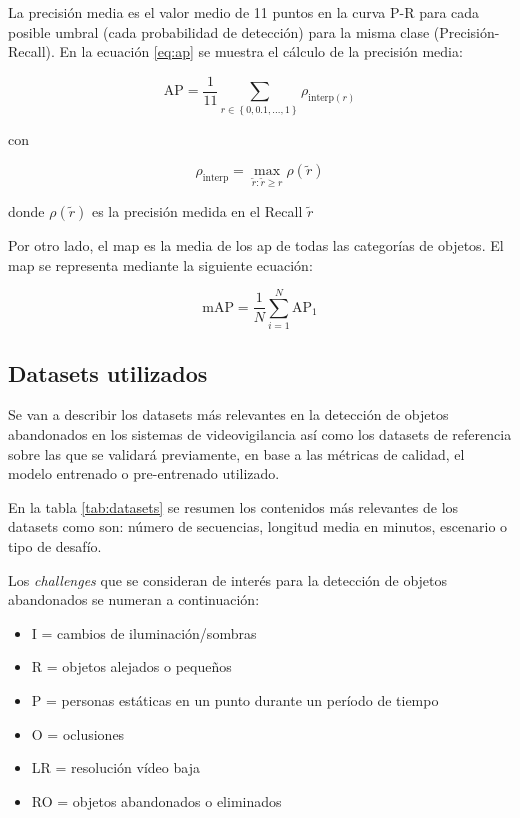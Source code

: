 La precisión media es el valor medio de 11 puntos en la curva P-R para cada posible umbral (cada probabilidad de detección) para la misma clase (Precisión-Recall). En la ecuación \ref{eq:ap} se muestra el cálculo de la precisión media:

\begin{equation}
\label{eq:ap}
\text{AP}=\frac{1}{11} \sum_{r\in \left \{ 0, 0.1, ...,1 \right \}}\rho_{\text{interp}\left ( r \right )}
\end{equation}

con

$$\rho_{\text{interp}} = \max_{\tilde{r}:\tilde{r} \geq r} \rho\left ( \tilde{r} \right )$$

donde $\rho\left ( \tilde{r} \right )$ es la precisión medida en el Recall $\tilde{r}$

Por otro lado, el \gls{map} es la media de los \gls{ap} de todas las categorías de objetos. El \gls{map} se representa mediante la siguiente ecuación:

\begin{equation}
\label{eq:map}
\text{mAP} = \frac{1}{N} \sum_{i=1}^{N} \text{AP}_{1}
\end{equation}

\subsection{Datasets utilizados}
\label{subsec:datasets-utilizados}

Se van a describir los datasets más relevantes en la detección de objetos abandonados en los sistemas de videovigilancia así como los datasets de referencia sobre las que se validará previamente, en base a las métricas de calidad, el modelo entrenado o pre-entrenado utilizado.

En la tabla \ref{tab:datasets} se resumen los contenidos más relevantes de los datasets como son: número de secuencias, longitud media en minutos, escenario o tipo de desafío.

Los \textit{challenges} que se consideran de interés para la detección de objetos abandonados se numeran a continuación:

\begin{itemize}
    \item I = cambios de iluminación/sombras
    \item R = objetos alejados o pequeños
    \item P = personas estáticas en un punto durante un período de tiempo
    \item O = oclusiones
    \item LR = resolución vídeo baja
    \item RO = objetos abandonados o eliminados
\end{itemize}

